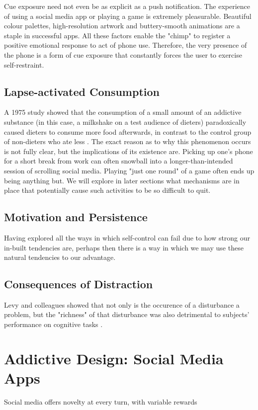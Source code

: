 Cue exposure need not even be as explicit as a push notification. The experience of using a social media app or playing a game is extremely pleasurable. Beautiful colour palettes, high-resolution artwork and buttery-smooth animations are a staple in successful apps. All these factors enable the "chimp" to register a positive emotional response to act of phone use. Therefore, the very presence of the phone is a form of cue exposure that constantly forces the user to exercise self-restraint.

\subsection{Lapse-activated Consumption}
A 1975 study showed that the consumption of a small amount of an addictive substance (in this case, a milkshake on a test audience of dieters) paradoxically caused dieters to consume more food afterwards, in contrast to the control group of non-dieters who ate less \cite{herman1975restrained}. The exact reason as to why this phenomenon occurs is not fully clear, but the implications of its existence are. Picking up one's phone for a short break from work can often snowball into a longer-than-intended session of scrolling social media. Playing "just one round" of a game often ends up being anything but. We will explore in later sections what mechanisms are in place that potentially cause such activities to be so difficult to quit.

\subsection{Motivation and Persistence}
Having explored all the ways in which self-control can fail due to how strong our in-built tendencies are, perhaps then there is a way in which we may use these natural tendencies to our advantage.

\subsection{Consequences of Distraction}
Levy and colleagues showed that not only is the occurence of a disturbance a problem, but the "richness" of that disturbance was also detrimental to subjects' performance on cognitive tasks \cite{levy2016effect}.


\section{Addictive Design: Social Media Apps}
Social media offers novelty at every turn, with variable rewards

